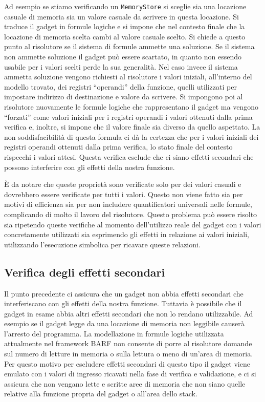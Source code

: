Ad esempio se stiamo verificando un \lstinline{MemoryStore} si sceglie
sia una locazione casuale di memoria sia un valore casuale da scrivere
in questa locazione. Si traduce il gadget in formule logiche e si
impone che nel contesto finale che la locazione di memoria scelta
cambi al valore casuale scelto. Si chiede a questo punto al risolutore
se il sistema di formule ammette una soluzione. Se il sistema non
ammette soluzione il gadget può essere scartato, in quanto non essendo
usabile per i valori scelti perde la sua generalità. Nel caso invece
il sistema ammetta soluzione vengono richiesti al risolutore i valori
iniziali, all'interno del modello trovato, dei registri ``operandi''
della funzione, quelli utilizzati per impostare indirizzo di
destinazione e valore da scrivere. Si impongono poi al risolutore
nuovamente le formule logiche che rappresentano il gadget ma vengono
``forzati'' come valori iniziali per i registri operandi i valori
ottenuti dalla prima verifica e, inoltre, si impone che il valore
finale sia diverso da quello aspettato. La non soddisfacibilità di
questa formula ci dà la certezza che per i valori iniziali dei
registri operandi ottenuti dalla prima verifica, lo stato finale del
contesto rispecchi i valori attesi. Questa verifica esclude che ci
siano effetti secondari che possono interferire con gli effetti della
nostra funzione.

È da notare che queste proprietà sono verificate solo per dei valori
casuali e dovrebbero essere verificate per tutti i valori. Questo non
viene fatto sia per motivi di efficienza sia per non includere
quantificatori universali nelle formule, complicando di molto il
lavoro del risolutore. Questo problema può essere risolto sia
ripetendo queste verifiche al momento dell'utilizzo reale del gadget
con i valori concretamente utilizzati sia esprimendo gli effetti in
relazione ai valori iniziali, utilizzando l'esecuzione simbolica per
ricavare queste relazioni.

\subsection{Verifica degli effetti secondari}  

Il punto precedente ci assicura che un gadget non abbia effetti
secondari che interferiscano con gli effetti della nostra
funzione. Tuttavia è possibile che il gadget in esame abbia altri
effetti secondari che non lo rendano utilizzabile. Ad esempio se il
gadget legge da una locazione di memoria non leggibile causerà
l'arresto del programma. La modellazione in formule logiche utilizzata
attualmente nel framework BARF non consente di porre al risolutore
domande sul numero di letture in memoria o sulla lettura o meno di
un'area di memoria. Per questo motivo per escludere effetti secondari
di questo tipo il gadget viene emulato con i valori di ingresso
ricavati nella fase di verifica e validazione, e ci si assicura che
non vengano lette e scritte aree di memoria che non siano quelle
relative alla funzione propria del gadget o all'area dello stack.


